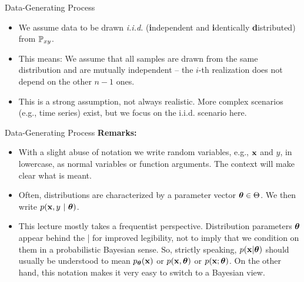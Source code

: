 \documentclass[11pt,compress,t,notes=noshow, xcolor=table]{beamer}
\begin{document}
\begin{frame}{Data-Generating Process}
\begin{itemize}
  \item We assume data to be drawn \emph{i.i.d.} (\textbf{i}ndependent and \textbf{i}dentically 
    \textbf{d}istributed) from $\mathbb{P}_{xy}$.
  \item This means: We assume that all samples are drawn from the same distribution and are mutually independent -- the $i$-th realization does not depend on the other $n-1$ ones.
  \item This is a strong assumption, not always realistic. 
  More complex scenarios (e.g., time series) exist, but we focus on the i.i.d. scenario here. 
\end{itemize}
\vfill
{}
{
}
\end{frame}


\begin{frame}{Data-Generating Process}
\textbf{Remarks:}
\begin{itemize}
  \item With a slight abuse of notation we write random variables, e.g., $\mathbf{x}$ and $y$, in lowercase, as normal variables or function arguments. The context 
  will make clear what is meant.
  \item Often, distributions are characterized by a parameter vector $\bm{\theta} \in \Theta$. We then write $p(\mathbf{x}, y ~|~ \bm{\theta})$.
  \item This lecture mostly takes a frequentist perspective. Distribution 
  parameters $\bm{\theta}$ appear behind the | for improved legibility, not to imply that we condition on them in a probabilistic Bayesian sense.
  So, strictly speaking, $p(\mathbf{x} | \bm{\theta})$ should usually be understood to mean $p_{\bm{\theta}}(\mathbf{x})$ or $p(\mathbf{x}, \bm{\theta})$ or $p(\mathbf{x}; \bm{\theta})$.
  On the other hand, this notation makes it very easy to switch to a Bayesian view.
\end{itemize}
\end{frame}

\endlecture
\end{document}
